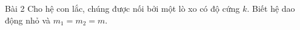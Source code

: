 \begin{frame}{Bài 2}
Cho hệ con lắc, chúng được nối bởi một lò xo có độ cứng \(k\). Biết hệ dao động nhỏ và \(m_1=m_2=m\).
\begin{center}
    \resizebox{0.5\linewidth}{!}{}
\end{center}
\end{frame}